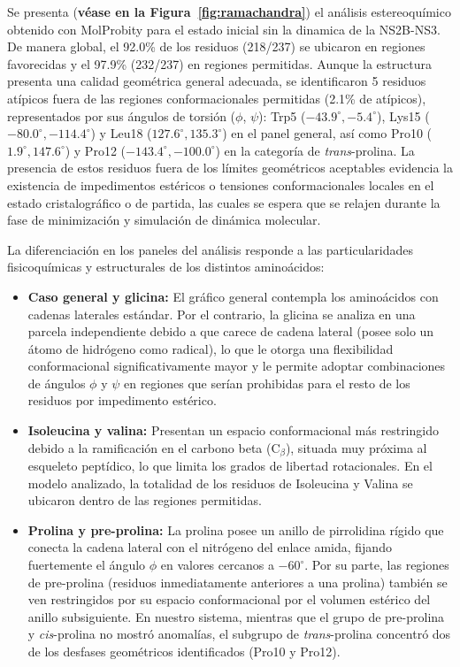 \begin{table}[htbp]
Se presenta (\textbf{véase en la Figura~\ref{fig:ramachandra}}) el análisis estereoquímico obtenido con MolProbity para el estado inicial sin la dinamica de la NS2B-NS3. De manera global, el 92.0\% de los residuos (218/237) se ubicaron en regiones favorecidas y el 97.9\% (232/237) en regiones permitidas. Aunque la estructura presenta una calidad geométrica general adecuada, se identificaron 5 residuos atípicos fuera de las regiones conformacionales permitidas (2.1\% de atípicos), representados por sus ángulos de torsión ($\phi$, $\psi$): Trp5 ($-43.9^\circ, -5.4^\circ$), Lys15 ($-80.0^\circ, -114.4^\circ$) y Leu18 ($127.6^\circ, 135.3^\circ$) en el panel general, así como Pro10 ($1.9^\circ, 147.6^\circ$) y Pro12 ($-143.4^\circ, -100.0^\circ$) en la categoría de \textit{trans}-prolina. La presencia de estos residuos fuera de los límites geométricos aceptables evidencia la existencia de impedimentos estéricos o tensiones conformacionales locales en el estado cristalográfico o de partida, las cuales se espera que se relajen durante la fase de minimización y simulación de dinámica molecular.

La diferenciación en los paneles del análisis responde a las particularidades fisicoquímicas y estructurales de los distintos aminoácidos:

\begin{itemize}
    \item \textbf{Caso general y glicina:} El gráfico general contempla los aminoácidos con cadenas laterales estándar. Por el contrario, la glicina se analiza en una parcela independiente debido a que carece de cadena lateral (posee solo un átomo de hidrógeno como radical), lo que le otorga una flexibilidad conformacional significativamente mayor y le permite adoptar combinaciones de ángulos $\phi$ y $\psi$ en regiones que serían prohibidas para el resto de los residuos por impedimento estérico.
    \item \textbf{Isoleucina y valina:} Presentan un espacio conformacional más restringido debido a la ramificación en el carbono beta ($\text{C}_\beta$), situada muy próxima al esqueleto peptídico, lo que limita los grados de libertad rotacionales. En el modelo analizado, la totalidad de los residuos de Isoleucina y Valina se ubicaron dentro de las regiones permitidas.
    \item \textbf{Prolina y pre-prolina:} La prolina posee un anillo de pirrolidina rígido que conecta la cadena lateral con el nitrógeno del enlace amida, fijando fuertemente el ángulo $\phi$ en valores cercanos a $-60^\circ$. Por su parte, las regiones de pre-prolina (residuos inmediatamente anteriores a una prolina) también se ven restringidos por su espacio conformacional por el volumen estérico del anillo subsiguiente. En nuestro sistema, mientras que el grupo de pre-prolina y \textit{cis}-prolina no mostró anomalías, el subgrupo de \textit{trans}-prolina concentró dos de los desfases geométricos identificados (Pro10 y Pro12).
\end{itemize}



\end{table}
